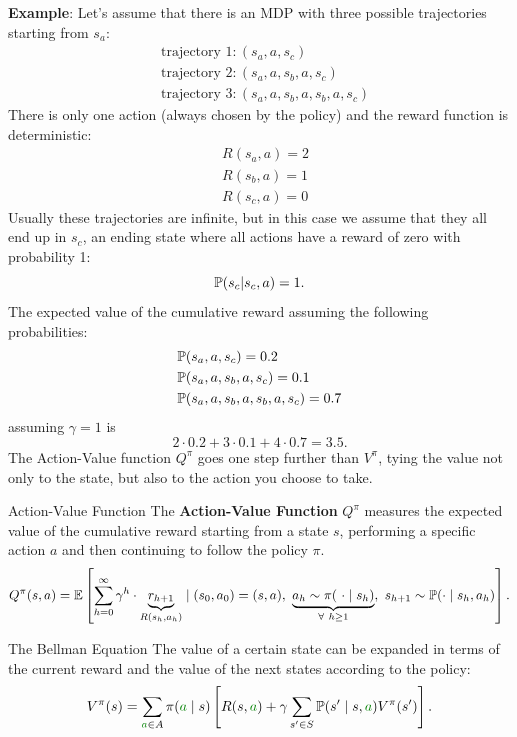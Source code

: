 \documentclass[10pt, a4paper]{report}
\begin{document}
\noindent \textbf{Example}: Let's assume that there is an MDP with three possible trajectories starting from $s_a$:\begin{align}
    &\text{trajectory 1}: (s_a, a,s_c)\\
    &\text{trajectory 2}: (s_a, a, s_b, a,s_c)\\
    &\text{trajectory 3}: (s_a, a, s_b, a,s_b,a,s_c)
\end{align}
There is only one action (always chosen by the policy) and the reward function is deterministic:\begin{align}
    &R(s_a,a)=2\\ 
    &R(s_b,a)=1\\ 
    &R(s_c,a)=0
\end{align} Usually these trajectories are infinite, but in this case we assume that they all end up in $s_c$, an ending state where all actions have a reward of zero with probability 1:\begin{equation}
    {\mathbb P}(s_c|s_c,a)=1.
\end{equation}
The expected value of the cumulative reward assuming the following probabilities:\begin{align}
    &{\mathbb P}(s_a, a,s_c)=0.2\\
    &{\mathbb P}(s_a, a, s_b, a,s_c)=0.1\\
    &{\mathbb P}(s_a, a, s_b, a,s_b,a,s_c)=0.7
\end{align}
assuming $\gamma=1$ is\begin{equation}
    2\cdot 0.2+3\cdot 0.1+ 4\cdot 0.7=3.5.
\end{equation}
The Action-Value function $Q^\pi$ goes one step further than $V^\pi$, tying the value not only to the state, but also to the action you choose to take.
\begin{boxdefinition}{Action-Value Function}{}
    The \textbf{Action-Value Function} $Q^\pi$  measures the expected value of the cumulative reward starting from a state $s$, performing a specific action $a$ and then continuing to follow the policy $\pi$.
    \begin{align}
    Q^\pi(s,a)={\mathbb E}\left[
         \sum_{h=0}^\infty\gamma^h\cdot\underbrace{r_{h+1}}_{R(s_h,a_h)} \mid 
         (s_0,a_0)=(s,a),\ \underbrace{a_h\sim \pi(\ \cdot \mid s_h)}_{\forall \ h \ge 1},\ s_{h+1}\sim {\mathbb P}(\cdot \mid s_h,a_h)
    \right].
\end{align}
\end{boxdefinition}
\begin{boxtheorem}{The Bellman Equation}{}
    The value of a certain state can be expanded in terms of the 
current reward and the value of the next states according to 
the policy:\begin{equation}\label{Bellman_V}
   V^\pi(s)=\sum_{\greenText{a}\in A}\pi(\greenText{a} \mid s)\left[
    R(s,\greenText{a})+\gamma\sum_{s'\in S}\Prob(s' \mid s,\greenText{a})V^\pi(s')
   \right].
\end{equation}
\end{boxtheorem}
\end{document}
